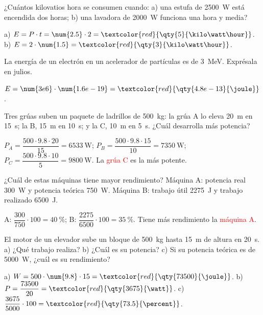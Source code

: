 \begin{exercise}
    ¿Cuántos kilovatios hora se consumen cuando: a) una estufa de \qty{2500}{\watt} está encendida dos horas; b) una lavadora de \qty{2000}{\watt} funciona una hora y media?
    \begin{solu}
        a) \(E = P \cdot t = \num{2.5} \cdot 2 = \textcolor{red}{\qty{5}{\kilo\watt\hour}}\). b) \(E = 2 \cdot \num{1.5} = \textcolor{red}{\qty{3}{\kilo\watt\hour}}\).
    \end{solu}
\end{exercise}

\begin{exercise}
    La energía de un electrón en un acelerador de partículas es de \qty{3}{\mega\electronvolt}. Exprésala en julios.
    \begin{solu}
        \(E = \num{3e6} \cdot \num{1.6e-19} = \textcolor{red}{\qty{4.8e-13}{\joule}}\).
    \end{solu}
\end{exercise}

\begin{exercise}
    Tres grúas suben un paquete de ladrillos de \qty{500}{\kg}: la grúa A lo eleva \qty{20}{\m} en \qty{15}{\s}; la B, \qty{15}{\m} en \qty{10}{\s}; y la C, \qty{10}{\m} en \qty{5}{\s}. ¿Cuál desarrolla más potencia?
    \begin{solu}
        \(P_A = \dfrac{500 \cdot \num{9.8} \cdot 20}{15} = \qty{6533}{\watt}\); \(P_B = \dfrac{500 \cdot \num{9.8} \cdot 15}{10} = \qty{7350}{\watt}\); \(P_C = \dfrac{500 \cdot \num{9.8} \cdot 10}{5} = \qty{9800}{\watt}\).
        La \textcolor{red}{grúa C} es la más potente.
    \end{solu}
\end{exercise}

\begin{exercise}
    ¿Cuál de estas máquinas tiene mayor rendimiento? Máquina A: potencia real \qty{300}{\watt} y potencia teórica \qty{750}{\watt}. Máquina B: trabajo útil \qty{2275}{\joule} y trabajo realizado \qty{6500}{\joule}.
    \begin{solu}
        A: \(\dfrac{300}{750} \cdot 100 = \qty{40}{\percent}\); B: \(\dfrac{2275}{6500} \cdot 100 = \qty{35}{\percent}\). Tiene más rendimiento la \textcolor{red}{máquina A}.
    \end{solu}
\end{exercise}

\begin{exercise}
    El motor de un elevador sube un bloque de \qty{500}{\kg} hasta \qty{15}{\m} de altura en \qty{20}{\s}. a) ¿Qué trabajo realiza? b) ¿Cuál es su potencia? c) Si su potencia teórica es de \qty{5000}{\watt}, ¿cuál es su rendimiento?
    \begin{solu}
        a) \(W = 500 \cdot \num{9.8} \cdot 15 = \textcolor{red}{\qty{73500}{\joule}}\). b) \(P = \dfrac{73500}{20} = \textcolor{red}{\qty{3675}{\watt}}\). c) \(\dfrac{3675}{5000} \cdot 100 = \textcolor{red}{\qty{73.5}{\percent}}\).
    \end{solu}
\end{exercise}

